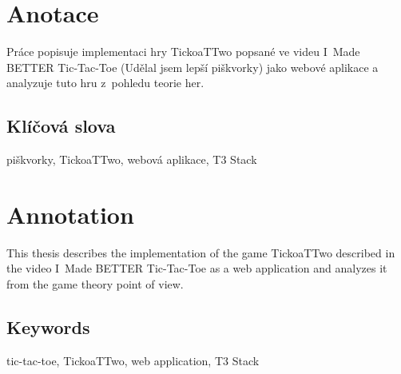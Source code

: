 \documentclass{socthesis}
\author{Marian Šámal}
\begin{document}
\maketitle






\pagestyle{empty}

\section*{Anotace}
Práce popisuje implementaci hry TickoaTTwo popsané ve videu I~Made BETTER
Tic-Tac-Toe (Udělal jsem lepší piškvorky) jako webové aplikace a analyzuje tuto
hru z~pohledu teorie her.

\subsection*{Klíčová slova}
piškvorky, TickoaTTwo, webová aplikace, T3 Stack

\vspace{20mm}

\section*{Annotation}
This thesis describes the implementation of the game TickoaTTwo described in
the video I~Made BETTER Tic-Tac-Toe as a web application and analyzes it from
the game theory point of view.

\subsection*{Keywords}
tic-tac-toe, TickoaTTwo, web application, T3 Stack


\newpage
\pagestyle{plain}
\tableofcontents %

\setcounter{figure}{0}
\setcounter{table}{0}
\newpage
{}
\setcounter{page}{7}  %
\end{document}
